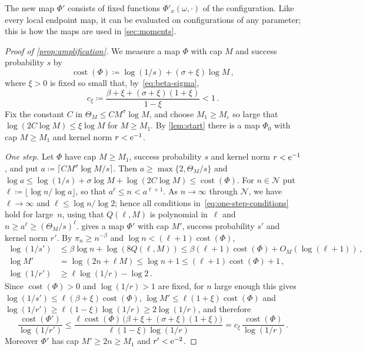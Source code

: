 The new map $\Phi'$ consists of fixed functions $\Phi'_x(\omega,\cdot)$ of the configuration. Like every
local endpoint map, it can be evaluated on configurations of any parameter; this is how the maps are used
in \cref{sec:moments}.

\begin{proof}[Proof of \cref{prop:amplification}]
We measure a map $\Phi$ with cap $M$ and success probability $s$ by
\begin{equation*}
  \operatorname{cost}(\Phi)\coloneqq\log(1/s)+(\sigma+\xi)\log M\,,
\end{equation*}
where $\xi>0$ is fixed so small that, by~\eqref{eq:beta-sigma},
\begin{equation*}
  c_\xi\coloneqq\frac{\beta+\xi+(\sigma+\xi)(1+\xi)}{1-\xi}<1\,.
\end{equation*}
Fix the constant $C$ in $\Theta_M\le CM^\sigma\log M$, and choose $M_1\ge M_\varepsilon$ so large that
$\log(2C\log M)\le\xi\log M$ for $M\ge M_1$. By \cref{lem:start} there is a map $\Phi_0$ with cap
$M\ge M_1$ and kernel norm $r<\mathrm{e}^{-1}$.

\emph{One step.} Let $\Phi$ have cap $M\ge M_1$, success probability $s$ and kernel norm
$r<\mathrm{e}^{-1}$, and put $a\coloneqq\lceil CM^\sigma\log M/s\rceil$. Then $a\ge\max\{2,\Theta_M/s\}$ and
$\log a\le\log(1/s)+\sigma\log M+\log(2C\log M)\le\operatorname{cost}(\Phi)$. For $n\in\mathcal N$ put
$\ell\coloneqq\lfloor\log n/\log a\rfloor$, so that $a^\ell\le n<a^{\ell+1}$. As $n\to\infty$ through
$\mathcal N$, we have $\ell\to\infty$ and $\ell\le\log n/\log2$; hence all conditions
in~\eqref{eq:one-step-conditions} hold for large~$n$, using that $Q(\ell,M)$ is polynomial in~$\ell$ and
$n\ge a^\ell\ge(\Theta_M/s)^\ell$.  gives a map $\Phi'$ with cap $M'$, success
probability $s'$ and kernel norm $r'$. By $\pi_n\ge n^{-\beta}$ and
$\log n<(\ell+1)\operatorname{cost}(\Phi)$,
\begin{align*}
  \log(1/s')&\le\beta\log n+\log(8Q(\ell,M))\le\beta(\ell+1)\operatorname{cost}(\Phi)+O_M(\log(\ell+1))\,,\\
  \log M'&=\log(2n+\ell M)\le\log n+1\le(\ell+1)\operatorname{cost}(\Phi)+1\,,\\
  \log(1/r')&\ge\ell\log(1/r)-\log2\,.
\end{align*}
Since $\operatorname{cost}(\Phi)>0$ and $\log(1/r)>1$ are fixed, for $n$ large enough this gives
$\log(1/s')\le\ell(\beta+\xi)\operatorname{cost}(\Phi)$, $\log M'\le\ell(1+\xi)\operatorname{cost}(\Phi)$
and $\log(1/r')\ge\ell(1-\xi)\log(1/r)\ge2\log(1/r)$, and therefore
\begin{equation*}
  \frac{\operatorname{cost}(\Phi')}{\log(1/r')}
  \le\frac{\ell\operatorname{cost}(\Phi)\,\bigl(\beta+\xi+(\sigma+\xi)(1+\xi)\bigr)}{\ell(1-\xi)\log(1/r)}
  =c_\xi\,\frac{\operatorname{cost}(\Phi)}{\log(1/r)}\,.
\end{equation*}
Moreover $\Phi'$ has cap $M'\ge2n\ge M_1$ and $r'<\mathrm{e}^{-2}$.


\end{proof}
